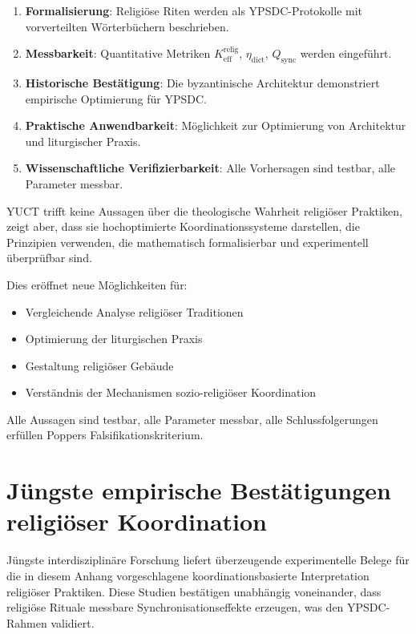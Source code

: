 \documentclass[12pt,a4paper]{article}
\begin{document}
	\begin{enumerate}
		\item \textbf{Formalisierung}: Religiöse Riten werden als YPSDC-Protokolle mit vorverteilten Wörterbüchern beschrieben.
		\item \textbf{Messbarkeit}: Quantitative Metriken $K_{\mathrm{eff}}^{\mathrm{relig}}$, $\eta_{\mathrm{dict}}$, $Q_{\mathrm{sync}}$ werden eingeführt.
		\item \textbf{Historische Bestätigung}: Die byzantinische Architektur demonstriert empirische Optimierung für YPSDC.
		\item \textbf{Praktische Anwendbarkeit}: Möglichkeit zur Optimierung von Architektur und liturgischer Praxis.
		\item \textbf{Wissenschaftliche Verifizierbarkeit}: Alle Vorhersagen sind testbar, alle Parameter messbar.
	\end{enumerate}
	
	YUCT trifft keine Aussagen über die theologische Wahrheit religiöser Praktiken, zeigt aber, dass sie hochoptimierte Koordinationssysteme darstellen, die Prinzipien verwenden, die mathematisch formalisierbar und experimentell überprüfbar sind.
	
	Dies eröffnet neue Möglichkeiten für:
	\begin{itemize}
		\item Vergleichende Analyse religiöser Traditionen
		\item Optimierung der liturgischen Praxis
		\item Gestaltung religiöser Gebäude
		\item Verständnis der Mechanismen sozio-religiöser Koordination
	\end{itemize}
	
	Alle Aussagen sind testbar, alle Parameter messbar, alle Schlussfolgerungen erfüllen Poppers Falsifikationskriterium.
	
	\section{Jüngste empirische Bestätigungen religiöser Koordination}
	\label{sec:recent-studies}
	
	Jüngste interdisziplinäre Forschung liefert überzeugende experimentelle Belege für die in diesem Anhang vorgeschlagene koordinationsbasierte Interpretation religiöser Praktiken. Diese Studien bestätigen unabhängig voneinander, dass religiöse Rituale messbare Synchronisationseffekte erzeugen, was den YPSDC-Rahmen validiert.
	
\end{document}
